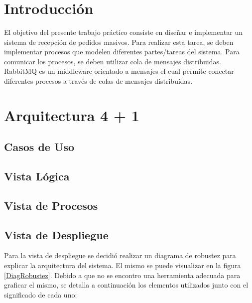 \documentclass[a4paper,10pt]{article}
\title{  }
\begin{document}
	\maketitle %
	\newpage

	\tableofcontents 
	\newpage

	\section{Introducción}
		El objetivo del presente trabajo práctico consiste en diseñar e 
        implementar un sistema de recepción de pedidos masivos. Para 
        realizar esta tarea, se deben implementar procesos que
        modelen diferentes partes/tareas del sistema. Para comunicar los 
        procesos, se deben utilizar cola de mensajes distribuidas. \\
        \indent RabbitMQ es un middleware orientado a mensajes el cual 
        permite conectar diferentes procesos a través de colas de mensajes
        distribuídas. 

    \newpage
    \section{Arquitectura 4 + 1}

    \newpage
    \subsection{Casos de Uso}

    \newpage
    \subsection{Vista Lógica}

    \newpage
    \subsection{Vista de Procesos}

    \newpage
    \subsection{Vista de Despliegue}
        Para la vista de despliegue se decidió realizar un diagrama de 
        robustez para explicar la arquitectura del sistema. El mismo se 
        puede visualizar en la figura \ref{DiagRobustez}. Debido a que
        no se encontro una herramienta adecuada para graficar el mismo,
        se detalla a continuación los elementos utilizados junto con el
        significado de cada uno:
\end{document}
